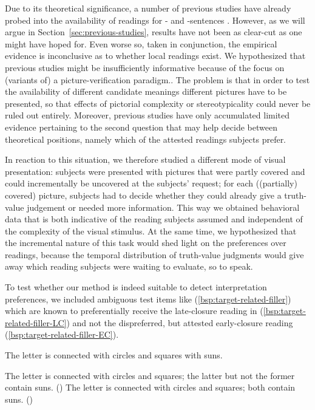 \documentclass[fleqn,reqno,10pt]{article}
\newcommand{\as}{\acro{as}}
\renewcommand{\es}{\acro{es}}
\newcommand{\lc}{\acro{lc}}
\newcommand{\ec}{\acro{ec}}
\newcommand{\LC}{\lc}
\newcommand{\EC}{\ec}
\begin{document}
Due to its theoretical significance, a number of previous studies have
already probed into the availability of readings for \as- and
\es-sentences
\citep[e.g.][]{GeurtsPouscoulous2009:Embedded-Implic,CliftonDube2010:Embedded-Implic,ChemlaSpector2010:Experimental-Ev}. However,
as we will argue in Section~\ref{sec:previous-studies}, results have
not been as clear-cut as one might have hoped for. Even worse so,
taken in conjunction, the empirical evidence is inconclusive as to
whether local readings exist. We hypothesized that previous studies
might be insufficiently informative because of the focus on (variants
of) a picture-verification paradigm..  The problem is that in order to test the availability of
different candidate meanings different pictures have to be presented,
so that effects of pictorial complexity or stereotypicality could
never be ruled out entirely. Moreover, previous studies have only
accumulated limited evidence pertaining to the second question that
may help decide between theoretical positions, namely which of the
attested readings subjects prefer.

In reaction to this situation, we therefore studied a different mode
of visual presentation: subjects were presented with pictures that
were partly covered and could incrementally be uncovered at the
subjects' request; for each ((partially) covered) picture, subjects
had to decide whether they could already give a truth-value judgement
or needed more information. This way we
obtained behavioral data that is both indicative of the reading
subjects assumed and independent of the complexity of the visual
stimulus. At the same time, we hypothesized that the incremental
nature of this task would shed light on the preferences over readings,
because the temporal distribution of truth-value judgments would give
away which reading subjects were waiting to evaluate, so to speak. 

To test whether our method is indeed suitable to detect interpretation
preferences, we included ambiguous test items like
(\ref{bsp:target-related-filler}) which are known to preferentially
receive the late-closure reading in
(\ref{bsp:target-related-filler-LC}) and not the dispreferred, but
attested early-closure reading (\ref{bsp:target-related-filler-EC}).

    \begin{exe}
      \ex \label{bsp:target-related-filler} The letter is connected with circles and squares with
        suns.
        \begin{xlist}
          \ex \label{bsp:target-related-filler-LC} The letter is connected with circles and squares; the latter
            but not the former contain suns. \hfill (\LC)
          \ex \label{bsp:target-related-filler-EC} The letter is connected with circles and squares; both
            contain suns. \hfill (\EC)
        \end{xlist}
    \end{exe}
\end{document}
